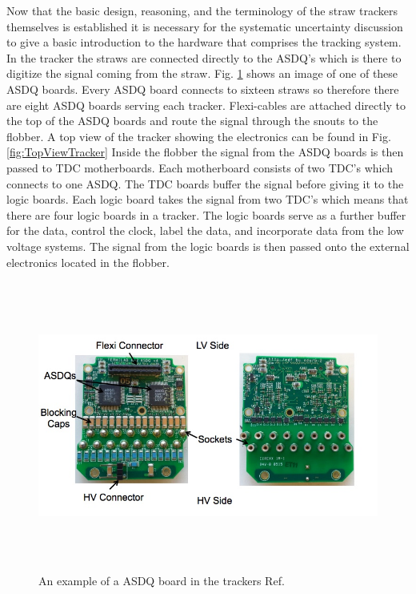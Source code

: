 \documentclass[./Thesis]{subfiles}
\begin{document}
	Now that the basic design, reasoning, and the terminology of the straw trackers themselves is established it is necessary for the systematic uncertainty discussion to give a basic introduction to the hardware that comprises the tracking system.  In the tracker the straws are connected directly to the ASDQ's which is there to digitize the signal coming from the straw.  Fig. \ref{fig:ASDQ} shows an image of one of these ASDQ boards.  Every ASDQ board connects to sixteen straws so therefore there are eight ASDQ boards serving each tracker.   Flexi-cables are attached directly to the top of the ASDQ boards and route the signal through the snouts to the flobber.  A top view of the tracker showing the electronics can be found in Fig. \ref{fig:TopViewTracker} Inside the flobber the signal from the ASDQ boards is then passed to TDC motherboards.  Each motherboard consists of two TDC's which connects to one ASDQ.  The TDC boards buffer the signal before giving it to the logic boards.  Each logic board takes the signal from two TDC's which means that there are four logic boards in a tracker.  The logic boards serve as a further buffer for the data, control the clock, label the data, and incorporate data from the low voltage systems.  The signal from the logic boards is then passed onto the external electronics located in the flobber.
	
\begin{figure}
	\centerline{\includegraphics[height=95mm]{ASDQ.jpeg}}
	\caption[Straw Tracker ASDQ]{ An example of a ASDQ board in the trackers Ref.\cite{jmottASDQ}
	}
	\label{fig:ASDQ}
\end{figure} 
	
\end{document}
